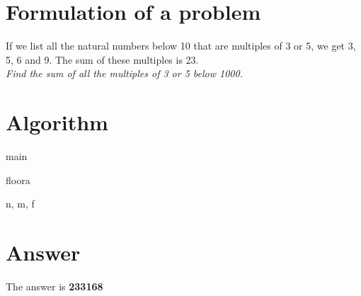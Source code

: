 \documentclass[12pt]{article}
\begin{document}
\maketitle

\section{Formulation of a problem}
If we list all the natural numbers below 10 that are multiples of 3 or 5, we
get 3, 5, 6 and 9. The sum of these multiples is 23. \\
\emph{Find the sum of all the multiples of 3 or 5 below 1000.}

\section{Algorithm}
\begin{eqcode}{main}{\ }{\ }{}
   \lend
\end{eqcode}

\begin{eqcode}{floor}{a}{}{}
\end{eqcode}

\begin{eqcode}{\gamma}{n, m}{, }{}
  f \gets \left \lfloor  {} \right \rfloor \lend
   \lend
\end{eqcode}

\section{Answer}
  The answer is \bf{233168}
\end{document}
